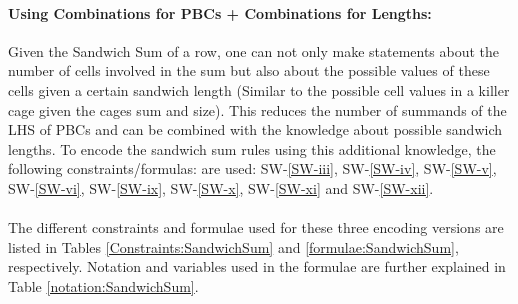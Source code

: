 \paragraph{Using Combinations for PBCs + Combinations for Lengths:} Given the Sandwich Sum of a row, one can not only make statements about the number of cells involved in the sum but also about the possible values of these cells given a certain sandwich length (Similar to the possible cell values in a killer cage given the cages sum and size). This reduces the number of summands of the LHS of PBCs and can be combined with the knowledge about possible sandwich lengths. To encode the sandwich sum rules using this additional knowledge, the following constraints/formulas: are used: SW-\ref{SW-iii}, SW-\ref{SW-iv}, SW-\ref{SW-v}, SW-\ref{SW-vi}, SW-\ref{SW-ix}, SW-\ref{SW-x}, SW-\ref{SW-xi} and SW-\ref{SW-xii}.\\
\\
The different constraints and formulae used for these three encoding versions are listed in Tables \ref{Constraints:SandwichSum} and \ref{formulae:SandwichSum}, respectively. Notation and variables used in the formulae are further explained in Table \ref{notation:SandwichSum}.

